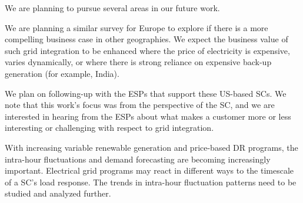 We are planning to pursue several areas in our future work.

We are planning a similar survey for Europe to explore if there is a more compelling business case 
in other geographies.
We expect the business value of such grid integration to be enhanced where the price of 
electricity is expensive, varies dynamically, or where there is strong reliance on expensive back-up 
generation (for example, India).  

We plan on following-up with the ESPs that support these US-based SCs. We note that this work's focus was from the perspective of the SC, and 
we are interested in hearing from the ESPs about what makes a customer more or less interesting or 
challenging with respect to grid integration.

With increasing variable renewable generation and price-based DR programs, the intra-hour fluctuations 
and demand forecasting are becoming increasingly important.
Electrical grid programs may react in different ways to the timescale of a SC's load response. The trends in intra-hour fluctuation patterns need to be studied and analyzed further.
